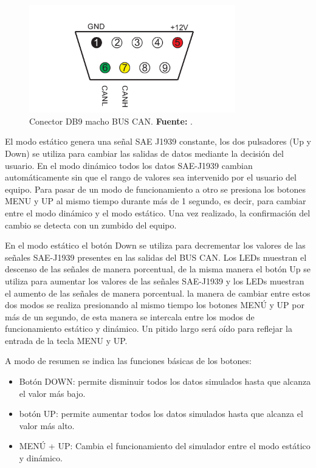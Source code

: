 \begin{figure}[H]
	\centering
		\includegraphics[width=0.8\textwidth]{./Cap6imagen/SimDb9.pdf}
	\caption[Conector DB9 macho BUS CAN.]{Conector DB9 macho BUS CAN.\textbf{ Fuente:} \cite{UserM}.}
	\label{DB9} %
\end{figure}

El modo estático genera una señal SAE J1939 constante, los  dos pulsadores (Up y Down) se utiliza para cambiar las salidas de datos mediante la decisión del usuario. 
En el modo dinámico todos los datos SAE-J1939 cambian automáticamente sin que el rango de valores sea intervenido por el usuario del equipo. 
Para pasar de un modo de funcionamiento a otro se presiona los botones MENU y UP al mismo tiempo durante más de 1 segundo, es decir, para cambiar entre el modo dinámico y el modo estático. 
Una vez realizado, la confirmación del cambio se detecta con un zumbido del equipo.

En el modo estático el botón Down se utiliza para decrementar los valores de las señales SAE-J1939 presentes en las salidas del BUS CAN. 
Los LEDs muestran el descenso de las señales de manera porcentual, de la misma manera el botón Up se utiliza para aumentar los valores de las señales SAE-J1939 y los LEDs muestran el aumento de las señales de manera porcentual. 
la manera de cambiar entre estos dos modos se realiza presionando al mismo tiempo los botones MENÚ y UP por más de un segundo, de esta manera se intercala entre los modos de funcionamiento estático y dinámico. 
Un pitido largo será oído para reflejar la entrada de la tecla MENU y UP.

A modo de resumen se indica las funciones básicas de los botones:
\begin{itemize}
\item Botón DOWN: permite disminuir todos los datos simulados hasta que alcanza el valor más bajo.
 \item botón UP: permite aumentar todos los datos simulados hasta que alcanza el valor más alto.
\item MENÚ + UP: Cambia el funcionamiento del simulador entre el modo estático y dinámico.

\end{itemize}

